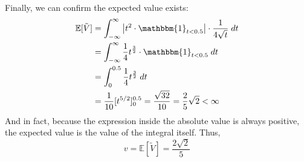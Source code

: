 \documentclass[12pt]{article}
\newcommand{\E}{\mathbb{E}}
\newcommand{\ind}{\mathbbm{1}}
\begin{document}
        Finally, we can confirm the expected value exists:
        \begin{align*}
            \E[\tilde V] &= \int_{-\infty}^\infty \big\vert t^2 \cdot \ind_{t < 0.5} \big\vert \cdot \frac{1}{4\sqrt t} \; dt \\
                &= \int_{-\infty}^\infty \frac{1}{4}t^{\frac{3}{2}} \cdot \ind_{t < 0.5} \; dt \\
                &= \int_0^{0.5} \frac{1}{4}t^{\frac{3}{2}}\; dt\\
                &= \frac{1}{10}[t^{5/2}]_0^{0.5} = \frac{\sqrt{32}}{10} = \frac{2}{5}\sqrt 2 < \infty
        \end{align*}
        And in fact, because the expression inside the absolute value is always positive, the expected value is the value of the integral itself. Thus, 
        \[v = \E[\tilde V] = \boxed{\frac{2\sqrt 2}{5}}\]
    \color{black}
\pagebreak
\end{document}
